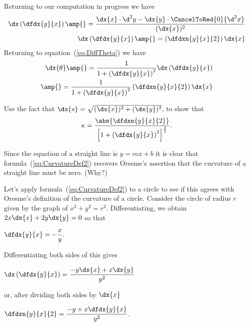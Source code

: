Returning to our computation in progress we have
\begin{align*}
  \dx\left(\dfdx{y}{x}\right) \amp{}=
                                \frac{\dx{x}\cdot
                                \d^2{y}-\dx{y}\cdot\CancelToRed{0}{\d^2{x}}}{(\dx{x})^2}\\
  \dx\left(\dfdx{y}{x}\right) \amp{}= \left(\dfdxn{y}{x}{2}\right)\dx{x}%
\end{align*}
Returning to equation~(\ref{eq:DiffTheta}) we have
\begin{align*}
  \dx{\theta}\amp{}=\frac{1}{1+\left(\dfdx{y}{x}\right)^2}\dx\left(\dfdx{y}{x}\right)\\
             \amp{}=\frac{1}{1+\left(\dfdx{y}{x}\right)^2}\left(\dfdxn{y}{x}{2}\right)\dx{x}%
\end{align*}


\begin{embeddedproblem}
  Use the fact that $\dx{s}=\sqrt{(\dx{x})^2+(\dx{y})^2}$, to show that
  \begin{equation}
    \kappa=\frac{\abs{\dfdxn{y}{x}{2}}}{\left[1+\left(\dfdx{y}{x}\right)^2\right]^{\frac32}}.\label{eq:CurvatureDef2}
  \end{equation}
  \vskip-6mm{}
\end{embeddedproblem}

Since the equation of a straight line is $y=mx+b$ it is clear that
formula~(\ref{eq:CurvatureDef2}) recovers Oresme's assertion that the
curvature of a straight line must be zero. (Why?)

Let's apply formula~(\ref{eq:CurvatureDef2}) to a circle to see if this
agrees with Oresme's definition of the curvature of a circle. 
Consider the circle of radius $r$ given by the graph of $x^2+y^2=r^2$.
Differentiating, we obtain $  2x\dx{x}+2y\dx{y}=0$ so that \\
\centerline{$\displaystyle \dfdx{y}{x}=-\frac{x}{y}.  $}
Differentiating both sides of this gives\\
\centerline{$\displaystyle
  \dx\left(\dfdx{y}{x}\right)=\frac{-y\dx{x}+x\dx{y}}{y^2}$}
or, after dividing both sides by $\dx{x}$\\
\centerline{$\displaystyle  \dfdxn{y}{x}{2}=\frac{-y+x\dfdx{y}{x}}{y^2}$.}



